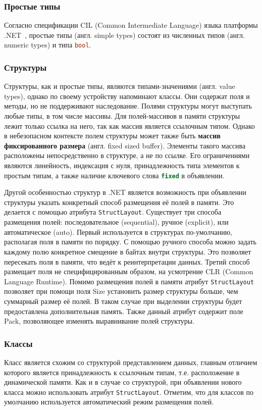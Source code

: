 \subsubsection{Простые типы}
Согласно спецификации CIL (Common Intermediate Language) языка платформы .NET~\cite{ecmatg3}, простые типы (англ. simple types) состоят из численных типов (англ. numeric types) и типа \lstinline[language=csharp]{bool}.

\subsubsection{Структуры}
Структуры, как и простые типы, являются типами-значениями (англ. value types), однако по своему устройству напоминают классы. Они содержат поля и методы, но не поддерживают наследование. Полями структуры могут выступать любые типы, в том числе массивы. Для полей-массивов в памяти структуры лежит только ссылка на него, так как массив является ссылочным типом. Однако в небезопасном контексте полем структуры может также быть \textbf{массив фиксированного размера} (англ. fixed sized buffer). Элементы такого массива расположены непосредственно в структуре, а не по ссылке. Его ограничениями являются линейность, индексация с нуля, принадлежность типа элементов к простым типам, а также наличие ключевого слова \lstinline[language=csharp]{fixed} в объявлении.

Другой особенностью структур в .NET является возможность при объявлении структуры указать конкретный способ размещения её полей в памяти. Это делается с помощью атрибута \lstinline[language=csharp]{StructLayout}. Существует три способа размещения полей: последовательное (sequential), ручное (explicit), или автоматическое (auto). Первый используется в структурах по-умолчанию, располагая поля в памяти по порядку. С помощью ручного способа можно задать каждому полю конкретное смещение в байтах внутри структуры. Это позволяет пересекать поля в памяти, что ведёт к реинтерпретации данных. Третий способ размещает поля не специфицированным образом, на усмотрение CLR (Common Language Runtime). Помимо размещения полей в памяти атрибут \lstinline[language=csharp]{StructLayout} позволяет при помощи поля Size установить размер структуры больше, чем суммарный размер её полей. В таком случае при выделении структуры будет предоставлена дополнительная память. Также данный атрибут содержит поле Pack, позволяющее изменять выравнивание полей структуры.

\subsubsection{Классы}
Класс является схожим со структурой представлением данных, главным отличием которого является принадлежность к ссылочным типам, т.е. расположение в динамической памяти. Как и в случае со структурой, при объявлении нового класса можно использовать атрибут \lstinline[language=csharp]{StructLayout}. Отметим, что для классов по умолчанию используется автоматический режим размещения полей.

